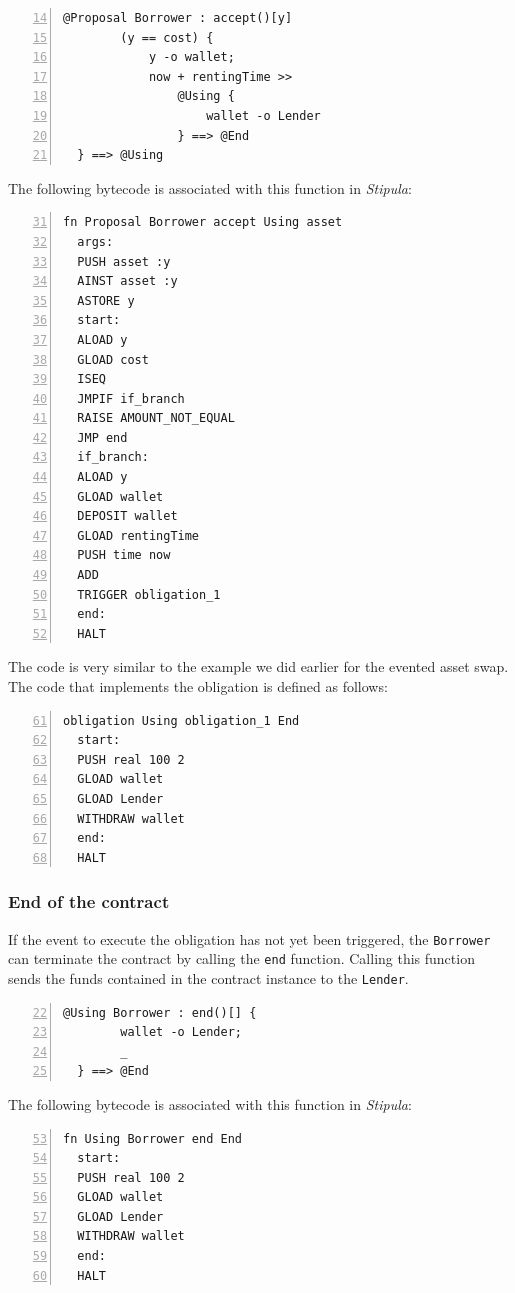 \begin{Verbatim}[numbers=left,xleftmargin=1cm,firstnumber=14,tabsize=2]
  @Proposal Borrower : accept()[y]
        (y == cost) {
            y -o wallet;
            now + rentingTime >>
                @Using {
                    wallet -o Lender
                } ==> @End
  } ==> @Using
\end{Verbatim}

The following bytecode is associated with this function in \textit{Stipula}:

\begin{Verbatim}[numbers=left,xleftmargin=1cm,firstnumber=31,tabsize=2]
  fn Proposal Borrower accept Using asset
  args:
  PUSH asset :y
  AINST asset :y
  ASTORE y
  start:
  ALOAD y
  GLOAD cost
  ISEQ
  JMPIF if_branch
  RAISE AMOUNT_NOT_EQUAL
  JMP end
  if_branch:
  ALOAD y
  GLOAD wallet
  DEPOSIT wallet
  GLOAD rentingTime
  PUSH time now
  ADD
  TRIGGER obligation_1
  end:
  HALT
\end{Verbatim}

The code is very similar to the example we did earlier for the evented asset swap. The code that 
implements the obligation is defined as follows:
\begin{Verbatim}[numbers=left,xleftmargin=1cm,firstnumber=61,tabsize=2]
  obligation Using obligation_1 End
  start:
  PUSH real 100 2
  GLOAD wallet
  GLOAD Lender
  WITHDRAW wallet
  end:
  HALT
\end{Verbatim}

\subsubsection{End of the contract}

If the event to execute the obligation has not yet been triggered, the \verb|Borrower| can terminate the 
contract by calling the \verb|end| function. Calling this function sends the funds contained in the 
contract instance to the \verb|Lender|.

\begin{Verbatim}[numbers=left,xleftmargin=1cm,firstnumber=22,tabsize=2]
  @Using Borrower : end()[] {
        wallet -o Lender;
        _
  } ==> @End
\end{Verbatim}

The following bytecode is associated with this function in \textit{Stipula}:

\begin{Verbatim}[numbers=left,xleftmargin=1cm,firstnumber=53,tabsize=2]
  fn Using Borrower end End
  start:
  PUSH real 100 2
  GLOAD wallet
  GLOAD Lender
  WITHDRAW wallet
  end:
  HALT
\end{Verbatim}

